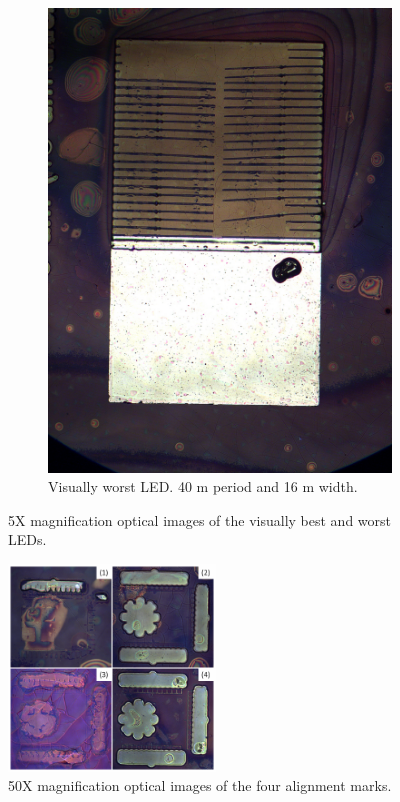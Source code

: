 \begin{figure}
\begin{subfigure}{0.49\linewidth}
        \includegraphics[width=\textwidth]{figures/led_40_16_5x.jpg}
        \caption{Visually worst LED. 40 \textmu m period and 16 \textmu m width.}
        \label{fig:worst_led}
    \end{subfigure}
    \caption{5X magnification optical images of the visually best and worst LEDs.}
\end{figure}

\begin{figure}
    \centering
    \includegraphics[width=0.49\textwidth]{figures/align_marks.png}
    \caption{50X magnification optical images of the four alignment marks.}
    \label{fig:align_marks}
\end{figure}


